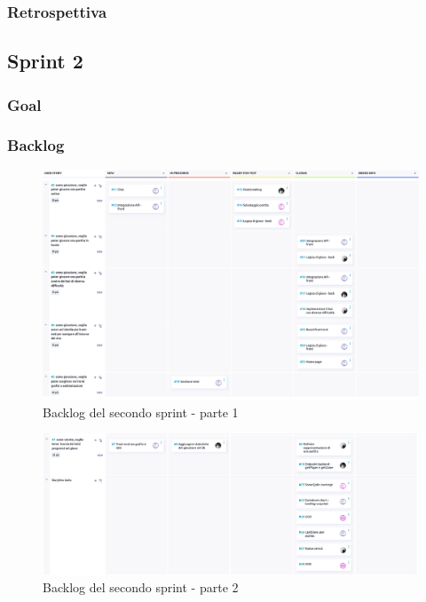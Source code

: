 \documentclass{article}
\begin{document}
\subsubsection{Retrospettiva}

\subsection{Sprint 2}

\subsubsection{Goal}

\subsubsection{Backlog}
\begin{figure}[H]
    \centering
    \includegraphics[width=1\textwidth]{backlog2_1}
    \caption{Backlog del secondo sprint - parte 1}
    \label{fig:backlog2_1}
\end{figure}

\begin{figure}[H]
    \centering
    \includegraphics[width=1\textwidth]{backlog2_2}
    \caption{Backlog del secondo sprint - parte 2}
    \label{fig:backlog2}
\end{figure}
\end{document}
